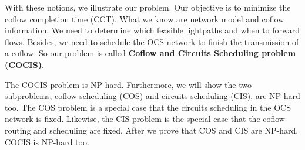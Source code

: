 With these notions, we illustrate our problem. Our objective is to minimize the coflow completion time (CCT). What we know are network model and coflow information. We need to determine which feasible lightpaths and when to forward flows. Besides, we need to schedule the OCS network to finish the transmission of a coflow. So our problem is called \textbf{Coflow and Circuits Scheduling problem (COCIS)}.

The COCIS problem is NP-hard. Furthermore, we will show the two subproblems, coflow scheduling (COS) and circuits scheduling (CIS), are NP-hard too. The COS problem is a special case that the circuits scheduling in the OCS network is fixed. Likewise, the CIS problem is the special case that the coflow routing and scheduling are fixed. After we prove that COS and CIS are NP-hard, COCIS is NP-hard too.


